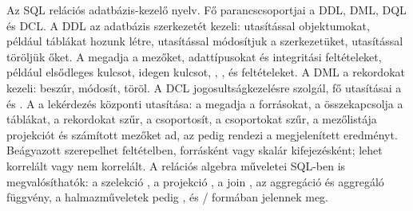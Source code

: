 \begin{summarybox}
Az SQL relációs adatbázis-kezelő nyelv. Fő parancscsoportjai a DDL, DML, DQL és DCL. A DDL az adatbázis szerkezetét kezeli:  utasítással objektumokat, például táblákat hozunk létre,  utasítással módosítjuk a szerkezetüket,  utasítással töröljük őket. A  megadja a mezőket, adattípusokat és integritási feltételeket, például elsődleges kulcsot, idegen kulcsot, , ,  és  feltételeket. A DML a rekordokat kezeli:  beszúr,  módosít,  töröl. A DCL jogosultságkezelésre szolgál, fő utasításai a  és . A  a lekérdezés központi utasítása: a  megadja a forrásokat, a  összekapcsolja a táblákat, a  rekordokat szűr, a  csoportosít, a  csoportokat szűr, a  mezőlistája projekciót és számított mezőket ad, az  pedig rendezi a megjelenített eredményt. Beágyazott  szerepelhet feltételben, forrásként vagy skalár kifejezésként; lehet korrelált vagy nem korrelált. A relációs algebra műveletei SQL-ben is megvalósíthatók: a szelekció , a projekció , a join , az aggregáció  és aggregáló függvény, a halmazműveletek pedig ,  és / formában jelennek meg.
\end{summarybox}
